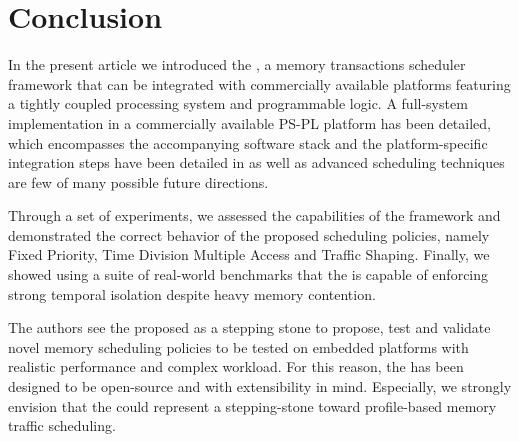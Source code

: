 \section{Conclusion}


In the present article we introduced the \schim, a memory transactions
scheduler framework that can be integrated with commercially available
platforms featuring a tightly coupled processing system and
programmable logic. A full-system implementation in a commercially
available PS-PL platform has been detailed, which encompasses the
accompanying software stack and the platform-specific integration
steps have been detailed in as well as advanced scheduling techniques
are few of many possible future directions.

Through a set of experiments, we assessed the capabilities of the
framework and demonstrated the correct behavior of the proposed
scheduling policies, namely Fixed Priority, Time Division Multiple
Access and Traffic Shaping. Finally, we showed using a suite of
real-world benchmarks that the \schim is capable of enforcing strong
temporal isolation despite heavy memory contention.

The authors see the proposed \schim as a stepping stone to propose,
test and validate novel memory scheduling policies to be tested on
embedded platforms with realistic performance and complex
workload. For this reason, the \schim has been designed to be
open-source and with extensibility in mind. Especially, we strongly
envision that the \schim could represent a stepping-stone toward
profile-based memory traffic scheduling.
